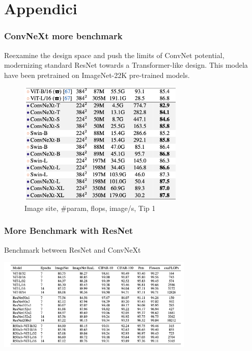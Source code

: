 \section{Appendici}

\begin{frame}
\frametitle{ConvNeXt more benchmark}
Reexamine the design space and push the limits of ConvNet potential, modernizing  standard ResNet towards a Transformer-like design.
This modela have been pretrained on ImageNet-22K pre-trained models.


\begin{figure}[h]
    \centering
    \includegraphics[width=0.7\textwidth]{img/4-section/ConvNext2.png}
    \caption{Image site, #param, flops, image/s, Tip 1}
\end{figure}

\end{frame}


\begin{frame}
\frametitle{More Benchmark with ResNet}
Benchmark between ResNet and ConvNeXt
\begin{center}
    \includegraphics[width=0.7\textwidth]{img/4-section/More-benchmark.png}
\end{center}

\end{frame}



